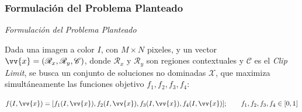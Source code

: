 \documentclass[usenames,dvipsnames]{beamer}
\begin{document}
\begin{frame}
\frametitle{Formulación del Problema Planteado} 
\begin{exampleblock}{\textit{Formulación del Problema Planteado}}

Dada una imagen a color $I$, con $M \times N$ pixeles, y un vector $\vv{x}= (\mathscr{R}_x, \mathscr{R}_y, \mathscr{C})$, donde $\mathscr{R}_x$ y $\mathscr{R}_y$ son regiones contextuales y $\mathscr{C}$ es el \textit{Clip Limit}, se busca un conjunto de soluciones no dominadas $\mathscr{X}$, que maximiza simultáneamente las funciones objetivo $f_1,f_2,f_3,f_4$:

\begin{equation}
f(I,\vv{x}) = [f_1(I,\vv{x}),f_2(I,\vv{x}),f_3(I,\vv{x}),f_4(I,\vv{x})]; \qquad f_1,f_2,f_3,f_4 \in [0,1]
\end{equation}


\end{exampleblock}


\end{frame}




\end{document}
